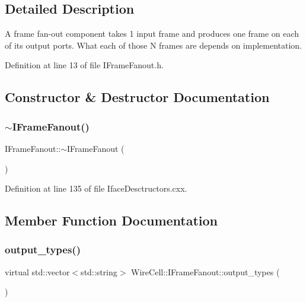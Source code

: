 \subsection{Detailed Description}
A frame fan-\/out component takes 1 input frame and produces one frame on each of its output ports. What each of those N frames are depends on implementation. 

Definition at line 13 of file I\+Frame\+Fanout.\+h.



\subsection{Constructor \& Destructor Documentation}
\mbox{\label{class_wire_cell_1_1_i_frame_fanout_a555e111d6764d29afa67bac941516cb9}} 
\subsubsection{\texorpdfstring{$\sim$\+I\+Frame\+Fanout()}{~IFrameFanout()}}
{\footnotesize\ttfamily I\+Frame\+Fanout\+::$\sim$\+I\+Frame\+Fanout (\begin{DoxyParamCaption}{ }\end{DoxyParamCaption})\hspace{0.3cm}{\ttfamily [virtual]}}



Definition at line 135 of file Iface\+Desctructors.\+cxx.



\subsection{Member Function Documentation}
\mbox{\label{class_wire_cell_1_1_i_frame_fanout_aa54a33e4454b6d2cced872b903641d4a}} 
\subsubsection{\texorpdfstring{output\+\_\+types()}{output\_types()}}
{\footnotesize\ttfamily virtual std\+::vector$<$std\+::string$>$ Wire\+Cell\+::\+I\+Frame\+Fanout\+::output\+\_\+types (\begin{DoxyParamCaption}{ }\end{DoxyParamCaption})\hspace{0.3cm}{\ttfamily [pure virtual]}}



